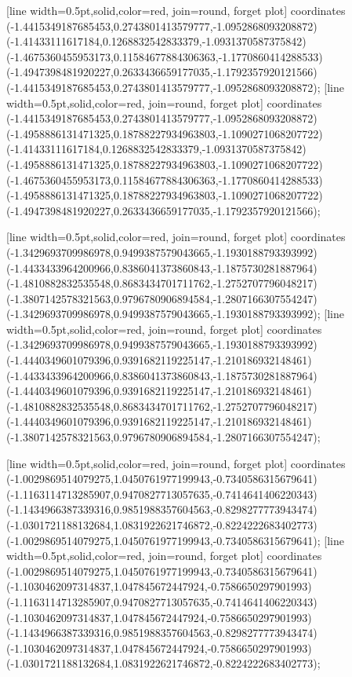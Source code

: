 [line width=0.5pt,solid,color=red, join=round, forget plot] coordinates {(-1.4415349187685453,0.2743801413579777,-1.0952868093208872) (-1.41433111617184,0.1268832542833379,-1.0931370587375842) (-1.4675360455953173,0.11584677884306363,-1.1770860414288533) (-1.4947398481920227,0.2633436659177035,-1.1792357920121566) (-1.4415349187685453,0.2743801413579777,-1.0952868093208872)};
[line width=0.5pt,solid,color=red, join=round, forget plot] coordinates {(-1.4415349187685453,0.2743801413579777,-1.0952868093208872) (-1.4958886131471325,0.18788227934963803,-1.1090271068207722) (-1.41433111617184,0.1268832542833379,-1.0931370587375842) (-1.4958886131471325,0.18788227934963803,-1.1090271068207722) (-1.4675360455953173,0.11584677884306363,-1.1770860414288533) (-1.4958886131471325,0.18788227934963803,-1.1090271068207722) (-1.4947398481920227,0.2633436659177035,-1.1792357920121566)};

[line width=0.5pt,solid,color=red, join=round, forget plot] coordinates {(-1.3429693709986978,0.9499387579043665,-1.1930188793393992) (-1.4433433964200966,0.8386041373860843,-1.1875730281887964) (-1.4810882832535548,0.8683434701711762,-1.2752707796048217) (-1.3807142578321563,0.9796780906894584,-1.2807166307554247) (-1.3429693709986978,0.9499387579043665,-1.1930188793393992)};
[line width=0.5pt,solid,color=red, join=round, forget plot] coordinates {(-1.3429693709986978,0.9499387579043665,-1.1930188793393992) (-1.4440349601079396,0.9391682119225147,-1.210186932148461) (-1.4433433964200966,0.8386041373860843,-1.1875730281887964) (-1.4440349601079396,0.9391682119225147,-1.210186932148461) (-1.4810882832535548,0.8683434701711762,-1.2752707796048217) (-1.4440349601079396,0.9391682119225147,-1.210186932148461) (-1.3807142578321563,0.9796780906894584,-1.2807166307554247)};

[line width=0.5pt,solid,color=red, join=round, forget plot] coordinates {(-1.0029869514079275,1.0450761977199943,-0.7340586315679641) (-1.1163114713285907,0.9470827713057635,-0.7414641406220343) (-1.1434966387339316,0.9851988357604563,-0.8298277773943474) (-1.0301721188132684,1.0831922621746872,-0.8224222683402773) (-1.0029869514079275,1.0450761977199943,-0.7340586315679641)};
[line width=0.5pt,solid,color=red, join=round, forget plot] coordinates {(-1.0029869514079275,1.0450761977199943,-0.7340586315679641) (-1.1030462097314837,1.047845672447924,-0.7586650297901993) (-1.1163114713285907,0.9470827713057635,-0.7414641406220343) (-1.1030462097314837,1.047845672447924,-0.7586650297901993) (-1.1434966387339316,0.9851988357604563,-0.8298277773943474) (-1.1030462097314837,1.047845672447924,-0.7586650297901993) (-1.0301721188132684,1.0831922621746872,-0.8224222683402773)};


